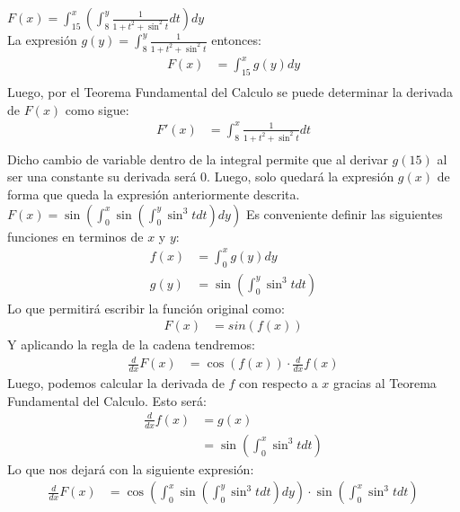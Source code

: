 \documentclass[../../main.tex]{subfiles}
\begin{document}
\begin{partes}
        \parte $F(x) = \int_{15}^{x} \left(\int_{8}^y \frac{1}{1+t^2+\sin^2t} dt\right) dy$\\
        La expresión $g(y) = \int_{8}^y \frac{1}{1+t^2+\sin^2t}$ entonces:
        \begin{align*}
            F(x) &= \int_{15}^x g(y) dy\\
        \end{align*} 
        Luego, por el Teorema Fundamental del Calculo se puede determinar la derivada de $F(x)$ como sigue:
        \begin{align*}
            F'(x) &= \int_{8}^x \frac{1}{1+t^2+\sin^2t} dt\\
        \end{align*}
        Dicho cambio de variable dentro de la integral permite que al derivar $g(15)$ al ser una constante su derivada será $0$.
        Luego, solo quedará la expresión $g(x)$ de forma que queda la expresión anteriormente descrita.
        \parte $F(x) = \sin\left(\int_0^x \sin \left(\int_0^y \sin^3t dt\right)dy \right)$
        Es conveniente definir las siguientes funciones en terminos de $x$ y $y$:
        \begin{align*}
            f(x) &= \int_0^x g(y) dy\\
            g(y) &= \sin\left(\int_0^y \sin^3t dt\right)
        \end{align*}
        Lo que permitirá escribir la función original como:
        \begin{align*}
            F(x) &= sin(f(x))
        \end{align*}
        Y aplicando la regla de la cadena tendremos:
        \begin{align*}
            \frac{d}{dx} F(x) &= \cos(f(x)) \cdot \frac{d}{dx} f(x)
        \end{align*}
        Luego, podemos calcular la derivada de $f$ con respecto a $x$ gracias al Teorema Fundamental del Calculo. Esto será:
        \begin{align*}
            \frac{d}{dx} f(x) &= g(x)\\
            &= \sin\left(\int_0^x \sin^3 t dt\right)
        \end{align*}
        Lo que nos dejará con la siguiente expresión:
        \begin{align*}
            \frac{d}{dx} F(x) &= \cos\left(\int_0^x \sin\left(\int_0^y \sin^3t dt\right) dy\right) \cdot \sin\left(\int_0^x \sin^3t dt\right)\\
        \end{align*}
    \end{partes}
\end{document}
